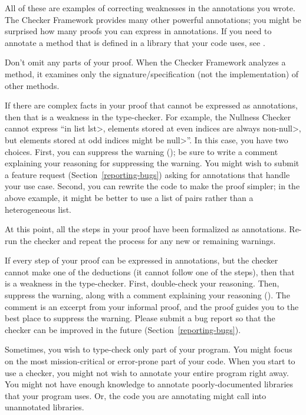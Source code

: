 All of these are examples of correcting weaknesses in the annotations you wrote.
The Checker Framework provides many other powerful annotations; you might
be surprised how many proofs you can express in annotations.
If you need to annotate a method that is defined in a
library that your code uses, see .

Don't omit any parts of your proof.  When the Checker Framework analyzes
a method, it examines only the signature/specification (not the implementation)
of other methods.

If there are complex facts in your proof that cannot be expressed as
annotations, then that is a weakness in the type-checker.  For example,
the Nullness Checker cannot express ``in list \<lst>, elements stored at
even indices are always non-\<null>, but elements stored at odd indices
might be \<null>''.  In this case, you have two choices.
%
First, you can suppress the warning
(); be sure to write a comment
explaining your reasoning for suppressing the warning.  You might wish to
submit a feature request (Section~\ref{reporting-bugs}) asking for
annotations that handle your use case.
%
Second, you can rewrite the code to make the proof simpler;
in the above example, it might be better to use a list of pairs
rather than a heterogeneous list.

At this point, all the steps in your proof have been formalized as
annotations.  Re-run the checker and repeat the process for any new or
remaining warnings.

If every step of your proof can be expressed in annotations, but the
checker cannot make one of the deductions (it cannot follow one of the
steps), then that is a weakness in the type-checker.  First, double-check
your reasoning.  Then, suppress the warning, along with a comment
explaining your reasoning ().
The comment is an excerpt from your informal proof, and the proof guides
you to the best place to suppress the warning.
Please submit a bug report so that the checker can be improved
in the future (Section~\ref{reporting-bugs}).





Sometimes, you wish to type-check only part of your program.
You might focus on the most mission-critical or error-prone part of your
code.  When you start to use a checker, you might not wish to annotate
your entire program right away.
You might not have
enough knowledge to annotate poorly-documented libraries that your program uses.
Or, the code you are annotating might call into unannotated libraries.

